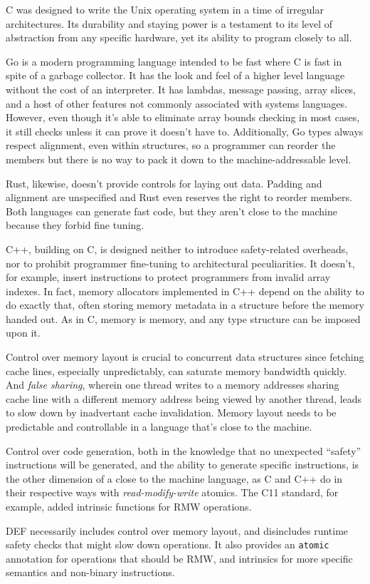C was designed to write the Unix operating system in a time of irregular architectures.  Its durability and staying power is a testament to its level of abstraction from any specific hardware, yet its ability to program closely to all.

Go is a modern programming language intended to be fast where C is fast in spite of a garbage collector.\cite{Go}  It has the look and feel of a higher level language without the cost of an interpreter.  It has lambdas, message passing, array slices, and a host of other features not commonly associated with systems languages.  However, even though it's able to eliminate array bounds checking in most cases, it still checks unless it can prove it doesn't have to.  Additionally, Go types always respect alignment, even within structures, so a programmer can reorder the members but there is no way to pack it down to the machine-addressable level.

Rust, likewise, doesn't provide controls for laying out data.  Padding and alignment are unspecified and Rust even reserves the right to reorder members.  Both languages can generate fast code, but they aren't close to the machine because they forbid fine tuning.

C++, building on C, is designed neither to introduce safety-related overheads, nor to prohibit programmer fine-tuning to architectural peculiarities.  It doesn't, for example, insert instructions to protect programmers from invalid array indexes.  In fact, memory allocators implemented in C++ depend on the ability to do exactly that, often storing memory metadata in a structure before the memory handed out.\cite{Hoard, TCMalloc, Supermalloc}  As in C, memory is memory, and any type structure can be imposed upon it.

Control over memory layout is crucial to concurrent data structures since fetching cache lines, especially unpredictably, can saturate memory bandwidth quickly.  And \textit{false sharing}, wherein one thread writes to a memory addresses sharing cache line with a different memory address being viewed by another thread, leads to slow down by inadvertant cache invalidation.  Memory layout needs to be predictable and controllable in a language that's close to the machine.

Control over code generation, both in the knowledge that no unexpected ``safety'' instructions will be generated, and the ability to generate specific instructions, is the other dimension of a close to the machine language, as C and C++ do in their respective ways with \textit{read-modify-write} atomics.  The C11 standard, for example, added intrinsic functions for RMW operations.\cite{C11Atomics}

DEF necessarily includes control over memory layout, and disincludes runtime safety checks that might slow down operations.  It also provides an \texttt{atomic} annotation for operations that should be RMW, and intrinsics for more specific semantics and non-binary instructions.
